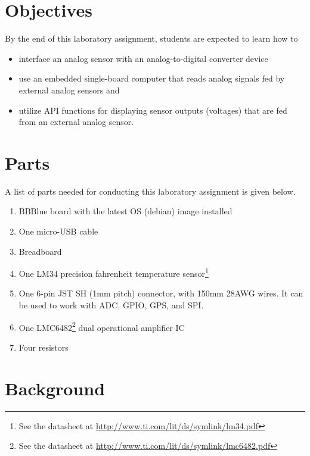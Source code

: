 \section{Objectives}
By the end of this laboratory assignment, students are expected to learn how to 

\begin{itemize}

\item interface an analog sensor with an analog-to-digital converter device

\item use an embedded single-board computer that reads analog signals fed by external analog  sensors and   
  
\item utilize API functions for displaying sensor outputs (voltages) that are fed from an  external analog sensor.  
  
\end{itemize}

\section{Parts}
\label{sec:partsADC}
A list of parts needed for conducting  this laboratory assignment is given below. %
%
\begin{enumerate}
\item BBBlue board with the latest OS (debian) image installed
\item One micro-USB cable
  
\item Breadboard
  
\item One LM34 precision fahrenheit temperature sensor\footnote{See the datasheet at \href{http://www.ti.com/lit/ds/symlink/lm34.pdf}{http://www.ti.com/lit/ds/symlink/lm34.pdf}}
  
\item One 6-pin JST SH (1mm pitch) connector, with 150mm 28AWG wires. It can be used to work with ADC, GPIO, GPS, and SPI.

  
\item One LMC6482\footnote{See the datasheet at \href{http://www.ti.com/lit/ds/symlink/lmc6482.pdf}{http://www.ti.com/lit/ds/symlink/lmc6482.pdf}} dual operational amplifier IC

  
\item Four resistors 
\end{enumerate}

\section{Background}
\label{sec:backgroundADC}

